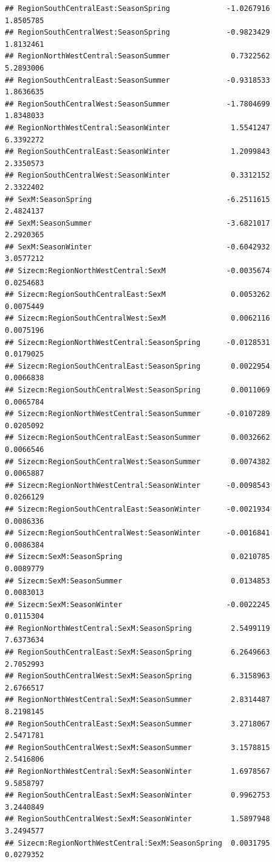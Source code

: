 \documentclass{article}\usepackage[]{graphicx}\usepackage[]{color}
\makeatletter
\newenvironment{kframe}{%
 \def\at@end@of@kframe{}%
 \ifinner\ifhmode%
  \def\at@end@of@kframe{\end{minipage}}%
  \begin{minipage}{\columnwidth}%
 \fi\fi%
 \def\FrameCommand##1{\hskip\@totalleftmargin \hskip-\fboxsep
 \colorbox{shadecolor}{##1}\hskip-\fboxsep
     \hskip-\linewidth \hskip-\@totalleftmargin \hskip\columnwidth}%
 \MakeFramed {\advance\hsize-\width
   \@totalleftmargin\z@ \linewidth\hsize
   \@setminipage}}%
 {\par\unskip\endMakeFramed%
 \at@end@of@kframe}
\newenvironment{knitrout}{}{} %
\makeatother
\begin{document}
\begin{knitrout}
\begin{kframe}
\begin{verbatim}
## RegionSouthCentralEast:SeasonSpring             -1.0267916  1.8505785
## RegionSouthCentralWest:SeasonSpring             -0.9823429  1.8132461
## RegionNorthWestCentral:SeasonSummer              0.7322562  5.2893006
## RegionSouthCentralEast:SeasonSummer             -0.9318533  1.8636635
## RegionSouthCentralWest:SeasonSummer             -1.7804699  1.8348033
## RegionNorthWestCentral:SeasonWinter              1.5541247  6.3392272
## RegionSouthCentralEast:SeasonWinter              1.2099843  2.3350573
## RegionSouthCentralWest:SeasonWinter              0.3312152  2.3322402
## SexM:SeasonSpring                               -6.2511615  2.4824137
## SexM:SeasonSummer                               -3.6821017  2.2920365
## SexM:SeasonWinter                               -0.6042932  3.0577212
## Sizecm:RegionNorthWestCentral:SexM              -0.0035674  0.0254683
## Sizecm:RegionSouthCentralEast:SexM               0.0053262  0.0075449
## Sizecm:RegionSouthCentralWest:SexM               0.0062116  0.0075196
## Sizecm:RegionNorthWestCentral:SeasonSpring      -0.0128531  0.0179025
## Sizecm:RegionSouthCentralEast:SeasonSpring       0.0022954  0.0066838
## Sizecm:RegionSouthCentralWest:SeasonSpring       0.0011069  0.0065784
## Sizecm:RegionNorthWestCentral:SeasonSummer      -0.0107289  0.0205092
## Sizecm:RegionSouthCentralEast:SeasonSummer       0.0032662  0.0066546
## Sizecm:RegionSouthCentralWest:SeasonSummer       0.0074382  0.0065887
## Sizecm:RegionNorthWestCentral:SeasonWinter      -0.0098543  0.0266129
## Sizecm:RegionSouthCentralEast:SeasonWinter      -0.0021934  0.0086336
## Sizecm:RegionSouthCentralWest:SeasonWinter      -0.0016841  0.0086384
## Sizecm:SexM:SeasonSpring                         0.0210785  0.0089779
## Sizecm:SexM:SeasonSummer                         0.0134853  0.0083013
## Sizecm:SexM:SeasonWinter                        -0.0022245  0.0115304
## RegionNorthWestCentral:SexM:SeasonSpring         2.5499119  7.6373634
## RegionSouthCentralEast:SexM:SeasonSpring         6.2649663  2.7052993
## RegionSouthCentralWest:SexM:SeasonSpring         6.3158963  2.6766517
## RegionNorthWestCentral:SexM:SeasonSummer         2.8314487  8.2198145
## RegionSouthCentralEast:SexM:SeasonSummer         3.2718067  2.5471781
## RegionSouthCentralWest:SexM:SeasonSummer         3.1578815  2.5416806
## RegionNorthWestCentral:SexM:SeasonWinter         1.6978567  9.5858797
## RegionSouthCentralEast:SexM:SeasonWinter         0.9962753  3.2440849
## RegionSouthCentralWest:SexM:SeasonWinter         1.5897948  3.2494577
## Sizecm:RegionNorthWestCentral:SexM:SeasonSpring  0.0031795  0.0279352

\end{verbatim}
\end{kframe}
\end{knitrout}
\end{document}
